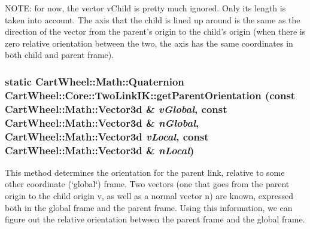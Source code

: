NOTE: for now, the vector vChild is pretty much ignored. Only its length is taken into account. The axis that the child is lined up around is the same as the direction of the vector from the parent's origin to the child's origin (when there is zero relative orientation between the two, the axis has the same coordinates in both child and parent frame). \hypertarget{classCartWheel_1_1Core_1_1TwoLinkIK_a79e039bab10cb8a0a80c673034b8d30f}{
\subsubsection[{getParentOrientation}]{\setlength{\rightskip}{0pt plus 5cm}static {\bf CartWheel::Math::Quaternion} CartWheel::Core::TwoLinkIK::getParentOrientation (const {\bf CartWheel::Math::Vector3d} \& {\em vGlobal}, \/  const {\bf CartWheel::Math::Vector3d} \& {\em nGlobal}, \/  {\bf CartWheel::Math::Vector3d} {\em vLocal}, \/  const {\bf CartWheel::Math::Vector3d} \& {\em nLocal})}}
\label{classCartWheel_1_1Core_1_1TwoLinkIK_a79e039bab10cb8a0a80c673034b8d30f}
This method determines the orientation for the parent link, relative to some other coordinate (\char`\"{}global\char`\"{}) frame. Two vectors (one that goes from the parent origin to the child origin v, as well as a normal vector n) are known, expressed both in the global frame and the parent frame. Using this information, we can figure out the relative orientation between the parent frame and the global frame.

